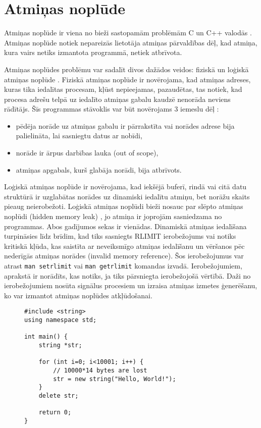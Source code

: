 ﻿\section{Atmiņas noplūde}


Atmiņas noplūde ir viena no bieži sastopamām problēmām C un C++ valodās \cite{atparv}.
Atmiņas noplūde notiek nepareizās lietotāja atmiņas pārvaldības dēļ, kad atmiņa, kura vairs netiks izmantota programmā, netiek atbrīvota.

Atmiņas noplūdes problēmu var sadalīt divos dažādos veidos: fiziskā un loģiskā atmiņas noplūde \cite{JMMR}.
Fiziskā atmiņas noplūde ir novērojama, kad atmiņas adreses, kuras tika iedalītas procesam,  kļūst nepieejamas, pazaudētas, tas notiek, kad procesa adrešu telpā uz iedalīto atmiņas gabalu kaudzē nenorāda neviens rādītājs.
Šīs programmas stāvoklis var būt novērojams 3 iemeslu dēļ \cite{JMMR}:
\begin{itemize}
\item pēdēja norāde uz atmiņas gabalu ir pārrakstīta vai norādes adrese bija palielināta, lai sasniegtu datus ar nobīdi,
\item norāde ir ārpus darbības lauka (out of scope),
\item atmiņas apgabals, kurš glabāja norādi, bija atbrīvots.
\end{itemize}

Loģiskā atmiņas noplūde ir novērojama, kad iekšējā buferī, rindā vai citā datu struktūrā ir uzglabātas norādes uz dinamiski iedalītu atmiņu, bet norāžu skaits pieaug neierobežoti.
Loģiskā atmiņas noplūdi bieži nosauc par slēpto atmiņas noplūdi (hidden memory leak) \cite{RRUU}, jo atmiņa ir joprojām sasniedzama no programmas.
Abos gadījumos sekas ir vienādas. 
Dinamiskā atmiņas iedalīšana turpināsies līdz brīdim, kad  tiks sasniegts RLIMIT ierobežojums vai notiks kritiskā kļūda, kas saistīta ar neveiksmīgo atmiņas iedalīšanu un vēršanos pēc nederīgās atmiņas norādes (invalid memory reference).
Šos ierobežojumus var atrast \texttt{man setrlimit} vai \texttt{man getrlimit} komandas izvadā. 
Ierobežojumiem, aprakstā ir norādīts, kas notiks, ja tiks pārsniegta ierobežojošā vērtībā.
Daži no ierobežojumiem nosūta signālus procesiem un izraisa atmiņas izmetes ģenerēšanu, ko var izmantot atmiņas noplūdes atkļūdošanai.
\begin{figure}[h]
\begin{lstlisting}
#include <string>
using namespace std;

int main() {
    string *str;

    for (int i=0; i<10001; i++) {
        // 10000*14 bytes are lost
        str = new string("Hello, World!");
    }
    delete str;

    return 0;
}
\end{lstlisting}
\caption{\textbf{\fontsize{11}{12}\selectfont {Atmiņas noplūde, C++}}}
\end{figure}

